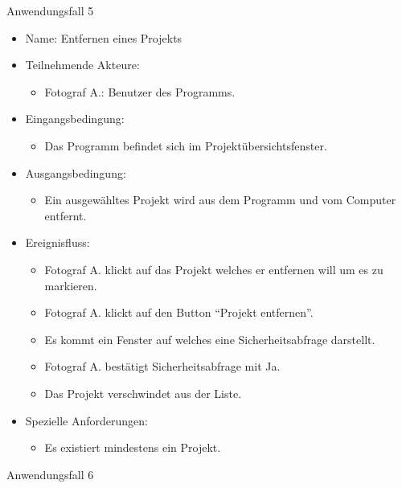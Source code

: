 \begin{itemize}
	\begin{description}
		\item[Anwendungsfall 5]
	\end{description}
	
		\begin{itemize}
			\item Name: Entfernen eines Projekts
			\item Teilnehmende Akteure:
			\begin{itemize}
				\item	Fotograf A.: Benutzer des Programms.	
			\end{itemize}
			\item Eingangsbedingung:
			\begin{itemize}
				\item	Das Programm befindet sich im Projektübersichtsfenster.		
			\end{itemize}
			\item Ausgangsbedingung:
			\begin{itemize}
				\item	Ein ausgewähltes Projekt wird aus dem Programm und vom Computer entfernt.		
			\end{itemize}
			\item Ereignisfluss:
			\begin{itemize}
				\item Fotograf A. klickt auf das Projekt welches er entfernen will um es zu markieren.
				\item Fotograf A. klickt auf den Button "`Projekt entfernen"'.
				\item Es kommt ein Fenster auf welches eine Sicherheitsabfrage darstellt.
				\item Fotograf A. bestätigt Sicherheitsabfrage mit Ja.
				\item Das Projekt verschwindet aus der Liste.
			\end{itemize}
			\item Spezielle Anforderungen:
			\begin{itemize}
				\item	Es existiert mindestens ein Projekt.		
			\end{itemize}			
		\end{itemize}
		
		\begin{description}
			\item[Anwendungsfall 6]
		\end{description}
		

\end{itemize}
